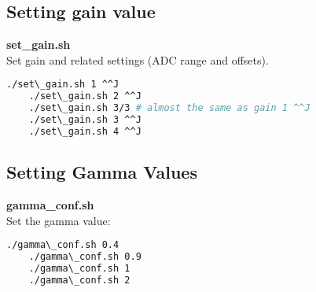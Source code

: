 \subsection{Setting gain value}

\textbf{set\_gain.sh}\\

Set gain and related settings (ADC range and offsets). 

\begin{lstlisting}[language=bash,morekeywords=$,keywordstyle=\bfseries,frame=none,xleftmargin=.25in,belowskip=2em]
    ./set\_gain.sh 1 ^^J
    ./set\_gain.sh 2 ^^J
    ./set\_gain.sh 3/3 # almost the same as gain 1 ^^J
    ./set\_gain.sh 3 ^^J
    ./set\_gain.sh 4 ^^J
\end{lstlisting}

\subsection{Setting Gamma Values}

\textbf{gamma\_conf.sh}\\

Set the gamma value: 

\begin{lstlisting}[language=bash,morekeywords=$,keywordstyle=\bfseries,frame=none,xleftmargin=.25in,belowskip=2em]
    ./gamma\_conf.sh 0.4
    ./gamma\_conf.sh 0.9
    ./gamma\_conf.sh 1
    ./gamma\_conf.sh 2
\end{lstlisting}
